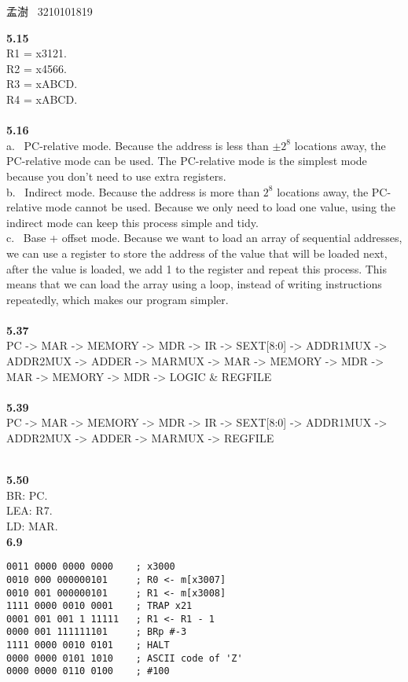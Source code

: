 \documentclass[a4paper,12pt]{article}     %
\begin{document}
\begin{center}   %
孟澍 \ 3210101819
\end{center}


\noindent %
\textbf{5.15}\\
R1 = x3121.\\
R2 = x4566.\\
R3 = xABCD.\\
R4 = xABCD.\\

~\\
\textbf{5.16}\\
a. \ PC-relative mode. Because the address is less than $\pm 2^8$ locations away, the PC-relative mode can be used. The PC-relative mode is the simplest mode because you don't need to use extra registers.\\
b. \ Indirect mode. Because the address is more than $2^8$ locations away, the PC-relative mode cannot be used. Because we only need to load one value, using the indirect mode can keep this process simple and tidy.\\
c. \ Base + offset mode. Because we want to load an array of sequential addresses, we can use a register to store the address of the value that will be loaded next, after the value is loaded, we add 1 to the register and repeat this process. This means that we can load the array using a loop, instead of writing instructions repeatedly, which makes our program simpler.\\

~\\
\textbf{5.37}\\
PC -> MAR -> MEMORY -> MDR -> IR -> SEXT[8:0] -> ADDR1MUX -> ADDR2MUX -> ADDER -> MARMUX -> MAR -> MEMORY -> MDR -> MAR -> MEMORY -> MDR -> LOGIC \& REGFILE\\

~\\
\textbf{5.39}\\
PC -> MAR -> MEMORY -> MDR -> IR -> SEXT[8:0] -> ADDR1MUX -> ADDR2MUX -> ADDER -> MARMUX -> REGFILE

~\\
\textbf{5.50}\\
BR: PC.\\
LEA: R7.\\
LD: MAR.\\

\noindent
\textbf{6.9}\\
\begin{Verbatim}[frame = single]
0011 0000 0000 0000    ; x3000
0010 000 000000101     ; R0 <- m[x3007]
0010 001 000000101     ; R1 <- m[x3008]
1111 0000 0010 0001    ; TRAP x21
0001 001 001 1 11111   ; R1 <- R1 - 1
0000 001 111111101     ; BRp #-3
1111 0000 0010 0101    ; HALT
0000 0000 0101 1010    ; ASCII code of 'Z'
0000 0000 0110 0100    ; #100
\end{Verbatim}
\end{document}
